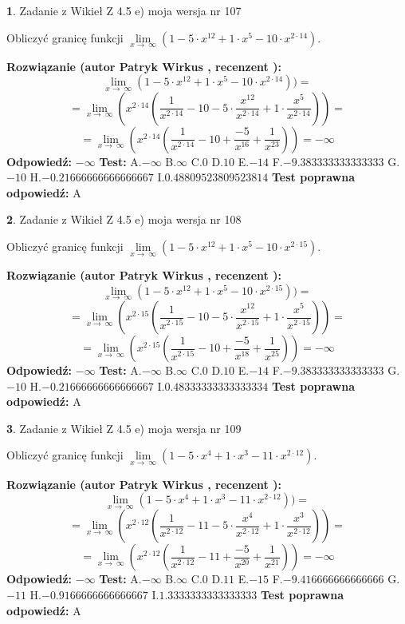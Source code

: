 \documentclass[12pt, a4paper]{article}
\theoremstyle{definition} %
\newtheorem{zad}{}
\newcommand{\zadStart}[1]{\begin{zad}#1\newline}
\newcommand{\zadStop}{\end{zad}}
\newcommand{\rozwStart}[2]{\noindent \textbf{Rozwiązanie (autor #1 , recenzent #2): }\newline}
\newcommand{\rozwStop}{\newline}
\newcommand{\odpStart}{\noindent \textbf{Odpowiedź:}\newline}
\newcommand{\odpStop}{\newline}
\newcommand{\testStart}{\noindent \textbf{Test:}\newline}
\newcommand{\testStop}{\newline}
\newcommand{\kluczStart}{\noindent \textbf{Test poprawna odpowiedź:}\newline}
\newcommand{\kluczStop}{\newline}
\begin{document}
\zadStart{Zadanie z Wikieł Z 4.5 e) moja wersja nr 107}


Obliczyć granicę funkcji  $\lim\limits_{x\to\ \infty}(1 - 5 \cdot x^{12}+1 \cdot x^{5}- 10 \cdot x^{2\cdot14})$.
\zadStop
\rozwStart{Patryk Wirkus}{}
$$\lim\limits_{x\to\ \infty}(1 - 5 \cdot x^{12}+1 \cdot x^{5}- 10 \cdot x^{2\cdot14}))=$$
$$=\lim\limits_{x\to\ \infty}(x^{2\cdot14}(\frac{1}{x^{2\cdot14}}-10 -5 \cdot \frac{x^{12}}{x^{2\cdot14}}+1 \cdot \frac{x^{5}}{x^{2\cdot14}}))=$$
$$=\lim\limits_{x\to\ \infty}(x^{2\cdot14}(\frac{1}{x^{2\cdot14}}-10 + \frac{-5}{x^{16}}+ \frac{1}{x^{23}}))=-\infty$$
\rozwStop
\odpStart
$-\infty$
\odpStop
\testStart
A.$-\infty$ B.$\infty$ C.$0$ D.$10$ E.$-14$
F.$-9.383333333333333$ G.$-10$
H.$-0.21666666666666667$
I.$0.48809523809523814$
\testStop
\kluczStart
A
\kluczStop



\zadStart{Zadanie z Wikieł Z 4.5 e) moja wersja nr 108}


Obliczyć granicę funkcji  $\lim\limits_{x\to\ \infty}(1 - 5 \cdot x^{12}+1 \cdot x^{5}- 10 \cdot x^{2\cdot15})$.
\zadStop
\rozwStart{Patryk Wirkus}{}
$$\lim\limits_{x\to\ \infty}(1 - 5 \cdot x^{12}+1 \cdot x^{5}- 10 \cdot x^{2\cdot15}))=$$
$$=\lim\limits_{x\to\ \infty}(x^{2\cdot15}(\frac{1}{x^{2\cdot15}}-10 -5 \cdot \frac{x^{12}}{x^{2\cdot15}}+1 \cdot \frac{x^{5}}{x^{2\cdot15}}))=$$
$$=\lim\limits_{x\to\ \infty}(x^{2\cdot15}(\frac{1}{x^{2\cdot15}}-10 + \frac{-5}{x^{18}}+ \frac{1}{x^{25}}))=-\infty$$
\rozwStop
\odpStart
$-\infty$
\odpStop
\testStart
A.$-\infty$ B.$\infty$ C.$0$ D.$10$ E.$-14$
F.$-9.383333333333333$ G.$-10$
H.$-0.21666666666666667$
I.$0.48333333333333334$
\testStop
\kluczStart
A
\kluczStop



\zadStart{Zadanie z Wikieł Z 4.5 e) moja wersja nr 109}


Obliczyć granicę funkcji  $\lim\limits_{x\to\ \infty}(1 - 5 \cdot x^{4}+1 \cdot x^{3}- 11 \cdot x^{2\cdot12})$.
\zadStop
\rozwStart{Patryk Wirkus}{}
$$\lim\limits_{x\to\ \infty}(1 - 5 \cdot x^{4}+1 \cdot x^{3}- 11 \cdot x^{2\cdot12}))=$$
$$=\lim\limits_{x\to\ \infty}(x^{2\cdot12}(\frac{1}{x^{2\cdot12}}-11 -5 \cdot \frac{x^{4}}{x^{2\cdot12}}+1 \cdot \frac{x^{3}}{x^{2\cdot12}}))=$$
$$=\lim\limits_{x\to\ \infty}(x^{2\cdot12}(\frac{1}{x^{2\cdot12}}-11 + \frac{-5}{x^{20}}+ \frac{1}{x^{21}}))=-\infty$$
\rozwStop
\odpStart
$-\infty$
\odpStop
\testStart
A.$-\infty$ B.$\infty$ C.$0$ D.$11$ E.$-15$
F.$-9.416666666666666$ G.$-11$
H.$-0.9166666666666667$
I.$1.3333333333333333$
\testStop
\kluczStart
A
\kluczStop
\end{document}
